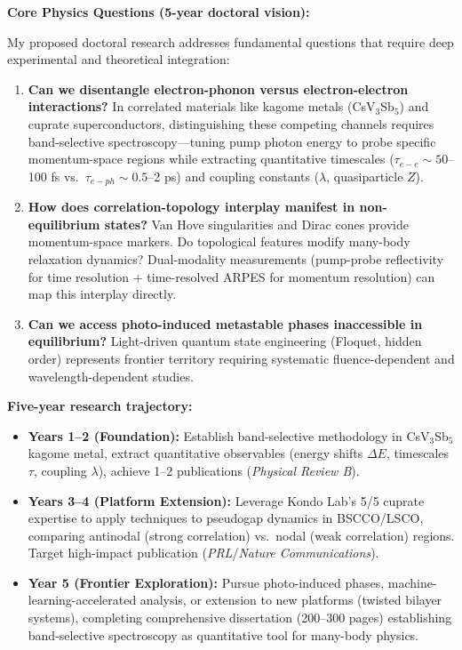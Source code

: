 \documentclass[11pt,a4paper]{article}
\begin{document}
\textbf{Core Physics Questions (5-year doctoral vision):}

My proposed doctoral research addresses fundamental questions that require deep experimental and theoretical integration:
\begin{enumerate}
    \item \textbf{Can we disentangle electron-phonon versus electron-electron interactions?} In correlated materials like kagome metals (CsV$_3$Sb$_5$) and cuprate superconductors, distinguishing these competing channels requires band-selective spectroscopy—tuning pump photon energy to probe specific momentum-space regions while extracting quantitative timescales ($\tau_{e-e} \sim 50$--100 fs vs.~$\tau_{e-ph} \sim 0.5$--2 ps) and coupling constants ($\lambda$, quasiparticle $Z$).
    
    \item \textbf{How does correlation-topology interplay manifest in non-equilibrium states?} Van Hove singularities and Dirac cones provide momentum-space markers. Do topological features modify many-body relaxation dynamics? Dual-modality measurements (pump-probe reflectivity for time resolution + time-resolved ARPES for momentum resolution) can map this interplay directly.
    
    \item \textbf{Can we access photo-induced metastable phases inaccessible in equilibrium?} Light-driven quantum state engineering (Floquet, hidden order) represents frontier territory requiring systematic fluence-dependent and wavelength-dependent studies.
\end{enumerate}

\textbf{Five-year research trajectory:}
\begin{itemize}
    \item \textbf{Years 1--2 (Foundation):} Establish band-selective methodology in CsV$_3$Sb$_5$ kagome metal, extract quantitative observables (energy shifts $\Delta E$, timescales $\tau$, coupling $\lambda$), achieve 1--2 publications (\textit{Physical Review B}).
    \item \textbf{Years 3--4 (Platform Extension):} Leverage Kondo Lab's 5/5 cuprate expertise to apply techniques to pseudogap dynamics in BSCCO/LSCO, comparing antinodal (strong correlation) vs.~nodal (weak correlation) regions. Target high-impact publication (\textit{PRL}/\textit{Nature Communications}).
    \item \textbf{Year 5 (Frontier Exploration):} Pursue photo-induced phases, machine-learning-accelerated analysis, or extension to new platforms (twisted bilayer systems), completing comprehensive dissertation (200--300 pages) establishing band-selective spectroscopy as quantitative tool for many-body physics.
\end{itemize}
\end{document}
